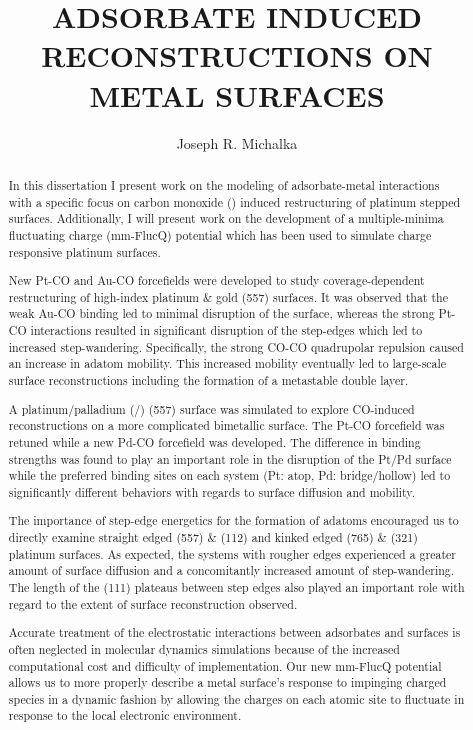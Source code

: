 \begin{abstract}
\label{chap:abstract}
\title{ADSORBATE INDUCED RECONSTRUCTIONS ON METAL SURFACES}
\author{Joseph R. Michalka}
In this dissertation I present work on the modeling of adsorbate-metal
interactions with a specific focus on carbon monoxide () induced
restructuring of platinum stepped surfaces. Additionally, I will present work
on the development of a multiple-minima fluctuating charge (mm-FlucQ) potential
which has been used to simulate charge responsive platinum surfaces.

New Pt-CO and Au-CO forcefields were developed to study coverage-dependent
restructuring of high-index platinum \& gold (557) surfaces. It was observed
that the weak Au-CO binding led to minimal disruption of the surface, whereas
the strong Pt-CO interactions resulted in significant disruption of the
step-edges which led to increased step-wandering. Specifically, the strong
CO-CO quadrupolar repulsion caused an increase in adatom mobility. This
increased mobility eventually led to large-scale surface reconstructions
including the formation of a metastable double layer.

A platinum/palladium (/) (557) surface was simulated to explore
CO-induced reconstructions on a more complicated bimetallic surface. The Pt-CO
forcefield was retuned while a new Pd-CO forcefield was developed.  The
difference in binding strengths was found to play an important role in the
disruption of the Pt/Pd surface while the preferred binding sites on each
system (Pt: atop, Pd: bridge/hollow) led to significantly different behaviors
with regards to surface diffusion and mobility.

The importance of step-edge energetics for the formation of adatoms encouraged
us to directly examine straight edged (557) \& (112) and kinked edged (765) \&
(321) platinum surfaces.  As expected, the systems with rougher edges
experienced a greater amount of surface diffusion and a concomitantly increased
amount of step-wandering. The length of the (111) plateaus between step edges
also played an important role with regard to the extent of surface
reconstruction observed.

Accurate treatment of the electrostatic interactions between adsorbates and
surfaces is often neglected in molecular dynamics simulations because of the
increased computational cost and difficulty of implementation.  Our new
mm-FlucQ potential allows us to more properly describe a metal surface's
response to impinging charged species in a dynamic fashion by allowing the
charges on each atomic site to fluctuate in response to the local electronic
environment.
\end{abstract}

